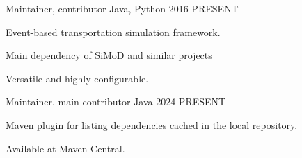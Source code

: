 \begin{cventries}
\cventry
{Maintainer, contributor} %
{} %
{Java, Python} %
{2016-PRESENT} %
{
  \begin{cvitems} %
    \item {Event-based transportation simulation framework.}
    \item {Main dependency of SiMoD and similar projects}
    \item {Versatile and highly configurable.}
  \end{cvitems}
}   

\cventry
{Maintainer, main contributor} %
{} %
{Java} %
{2024-PRESENT} %
{
  \begin{cvitems} %
    \item {Maven plugin for listing dependencies cached in the local repository.}
    \item {Available at Maven Central.}
  \end{cvitems}
}   


\end{cventries}
